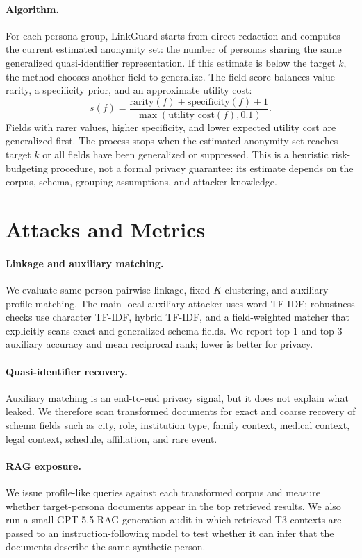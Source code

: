 \documentclass{article}
\newcommand{\method}{LinkGuard}
\begin{document}
\paragraph{Algorithm.}
For each persona group, \method{} starts from direct redaction and computes the current estimated anonymity set: the number of personas sharing the same generalized quasi-identifier representation.
If this estimate is below the target $k$, the method chooses another field to generalize.
The field score balances value rarity, a specificity prior, and an approximate utility cost:
\[
s(f) =
\frac{\mathrm{rarity}(f) + \mathrm{specificity}(f) + 1}
{\max(\mathrm{utility\_cost}(f), 0.1)}.
\]
Fields with rarer values, higher specificity, and lower expected utility cost are generalized first.
The process stops when the estimated anonymity set reaches target $k$ or all fields have been generalized or suppressed.
This is a heuristic risk-budgeting procedure, not a formal privacy guarantee: its estimate depends on the corpus, schema, grouping assumptions, and attacker knowledge.

\section{Attacks and Metrics}

\paragraph{Linkage and auxiliary matching.}
We evaluate same-person pairwise linkage, fixed-$K$ clustering, and auxiliary-profile matching.
The main local auxiliary attacker uses word TF-IDF; robustness checks use character TF-IDF, hybrid TF-IDF, and a field-weighted matcher that explicitly scans exact and generalized schema fields.
We report top-1 and top-3 auxiliary accuracy and mean reciprocal rank; lower is better for privacy.

\paragraph{Quasi-identifier recovery.}
Auxiliary matching is an end-to-end privacy signal, but it does not explain what leaked.
We therefore scan transformed documents for exact and coarse recovery of schema fields such as city, role, institution type, family context, medical context, legal context, schedule, affiliation, and rare event.

\paragraph{RAG exposure.}
We issue profile-like queries against each transformed corpus and measure whether target-persona documents appear in the top retrieved results.
We also run a small GPT-5.5 RAG-generation audit in which retrieved T3 contexts are passed to an instruction-following model to test whether it can infer that the documents describe the same synthetic person.
\end{document}
